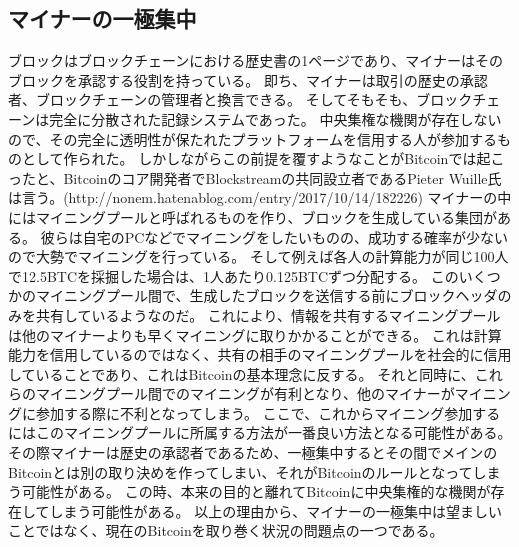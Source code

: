 \subsection{マイナーの一極集中}
ブロックはブロックチェーンにおける歴史書の1ページであり、マイナーはそのブロックを承認する役割を持っている。
即ち、マイナーは取引の歴史の承認者、ブロックチェーンの管理者と換言できる。
そしてそもそも、ブロックチェーンは完全に分散された記録システムであった。
中央集権な機関が存在しないので、その完全に透明性が保たれたプラットフォームを信用する人が参加するものとして作られた。
しかしながらこの前提を覆すようなことがBitcoinでは起こったと、Bitcoinのコア開発者でBlockstreamの共同設立者であるPieter Wuille氏は言う。(http://nonem.hatenablog.com/entry/2017/10/14/182226)
マイナーの中にはマイニングプールと呼ばれるものを作り、ブロックを生成している集団がある。
彼らは自宅のPCなどでマイニングをしたいものの、成功する確率が少ないので大勢でマイニングを行っている。
そして例えば各人の計算能力が同じ100人で12.5BTCを採掘した場合は、1人あたり0.125BTCずつ分配する。
このいくつかのマイニングプール間で、生成したブロックを送信する前にブロックヘッダのみを共有しているようなのだ。
これにより、情報を共有するマイニングプールは他のマイナーよりも早くマイニングに取りかかることができる。
これは計算能力を信用しているのではなく、共有の相手のマイニングプールを社会的に信用していることであり、これはBitcoinの基本理念に反する。
それと同時に、これらのマイニングプール間でのマイニングが有利となり、他のマイナーがマイニングに参加する際に不利となってしまう。
ここで、これからマイニング参加するにはこのマイニングプールに所属する方法が一番良い方法となる可能性がある。
その際マイナーは歴史の承認者であるため、一極集中するとその間でメインのBitcoinとは別の取り決めを作ってしまい、それがBitcoinのルールとなってしまう可能性がある。
この時、本来の目的と離れてBitcoinに中央集権的な機関が存在してしまう可能性がある。
以上の理由から、マイナーの一極集中は望ましいことではなく、現在のBitcoinを取り巻く状況の問題点の一つである。

